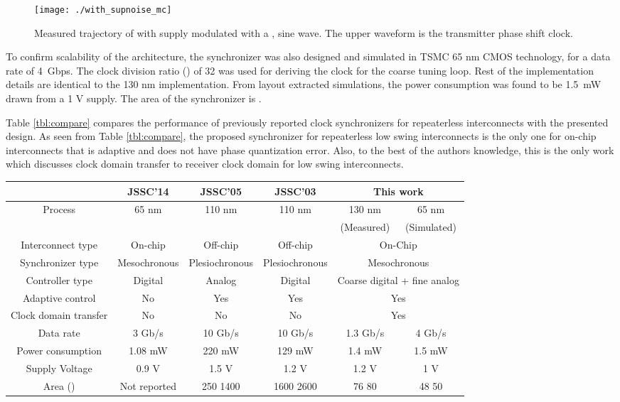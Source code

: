 \documentclass[journal,twoside,letterpaper]{IEEEtran}
\begin{document}
\begin{figure}[h!]
\centering
\texttt{[image: ./with\_supnoise\_mc]}
\caption{Measured trajectory of  with supply modulated with
a ,  sine wave. The upper waveform is the 
transmitter phase shift clock.}
\label{fig:withnoise}
\end{figure}

To confirm scalability of the architecture,
the synchronizer was also designed and simulated in TSMC 65 nm CMOS technology,
for a data rate of \mbox{4 Gbps}.
The clock division ratio () of 32 was used for
deriving the clock for the coarse tuning loop. Rest of the implementation details
are identical to the 130 nm implementation.
From layout extracted simulations, the power consumption was found to be
\mbox{1.5 mW} drawn from a 1 V supply. The area of the synchronizer is 
\mbox{}.

Table \ref{tbl:compare} compares the performance of 
previously reported clock synchronizers for repeaterless interconnects
with the presented design.
As seen from Table \ref{tbl:compare}, the proposed 
synchronizer for repeaterless low swing interconnects 
is the only one for on-chip interconnects
that is adaptive and does not have phase quantization error. 
Also, to the best of the authors knowledge, 
this is the only work which discusses clock domain transfer to receiver
clock domain for low swing interconnects.

\begin{table*}
\begin{center}
\caption{Comparison with other reported repeaterless synchronizers}
\label{tbl:compare}
\begin{tabular}{|c|c|c|c||c|c|}
\hline 
 & JSSC'14 \cite{Lee-jssc14} & JSSC'05 
\cite{phase_interpolator} & JSSC'03 \cite{dig_pi_jssc03} & 
\multicolumn{2}{c|}{This work} \\ \hline 
Process & 65 nm & 110 nm & 110 nm & 130 nm & 65 nm \\
 & & & & (Measured) & (Simulated) \\ \hline
Interconnect type & On-chip & Off-chip & Off-chip & \multicolumn{2}{c|}{On-Chip}\\ \hline
Synchronizer type & Mesochronous & Plesiochronous & Plesiochronous & \multicolumn{2}{c|}{Mesochronous} \\ \hline
Controller type & Digital & Analog & Digital & \multicolumn{2}{c|}{Coarse digital + fine analog} \\ \hline
Adaptive control & No & Yes & Yes & \multicolumn{2}{c|}{Yes} \\ \hline
Clock domain transfer & No & No & No & \multicolumn{2}{c|}{Yes} \\ \hline
Data rate & 3 Gb/s & 10 Gb/s & 10 Gb/s & 1.3 Gb/s & 4 Gb/s \\ \hline
Power consumption & 1.08 mW & 220 mW & 129 mW & 1.4 mW & 1.5 mW  \\ \hline
Supply Voltage & 0.9 V & 1.5 V & 1.2 V & 1.2 V & 1 V \\ \hline
Area () & Not reported & 250  1400 & 1600  2600 & 76  80 & 48  50\\ \hline
\end{tabular}
\end{center}
\end{table*}
\end{document}
